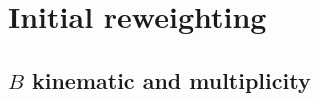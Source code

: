 \section{Initial reweighting}
\label{ref:mc-cor:init}


\subsection{$B$ kinematic and multiplicity}
\label{ref:mc-cor:init:jpsi-k}
